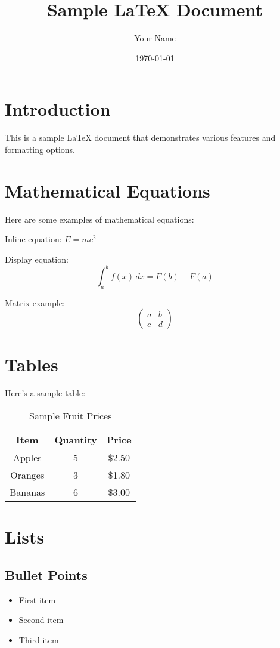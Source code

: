 \documentclass{article}
\title{Sample \LaTeX{} Document}
\author{Your Name}
\date{\today}
\begin{document}
\maketitle

\section{Introduction}
This is a sample \LaTeX{} document that demonstrates various features and formatting options.

\section{Mathematical Equations}
Here are some examples of mathematical equations:

Inline equation: $E = mc^2$

Display equation:
\begin{equation}
    \int_{a}^{b} f(x) \, dx = F(b) - F(a)
\end{equation}

Matrix example:
\begin{equation}
    \begin{pmatrix}
        a & b \\
        c & d
    \end{pmatrix}
\end{equation}

\section{Tables}
Here's a sample table:

\begin{table}[h]
    \centering
    \begin{tabular}{|c|c|c|}
        \hline
        Item & Quantity & Price \\
        \hline
        Apples & 5 & \$2.50 \\
        Oranges & 3 & \$1.80 \\
        Bananas & 6 & \$3.00 \\
        \hline
    \end{tabular}
    \caption{Sample Fruit Prices}
    \label{tab:fruits}
\end{table}

\section{Lists}
\subsection{Bullet Points}
\begin{itemize}
    \item First item
    \item Second item
    \item Third item
\end{itemize}
\end{document}
